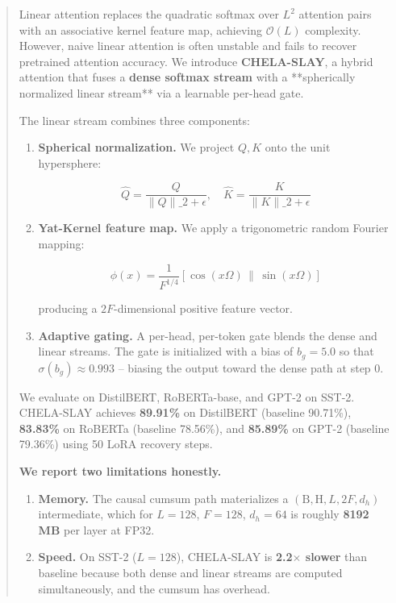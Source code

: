 \documentclass{article}
\begin{document}
\maketitle

\begin{abstract}
Linear attention replaces the quadratic softmax over $L^2$ attention pairs 
with an associative kernel feature map, achieving $\mathcal{O}(L)$ complexity. 
However, naive linear attention is often unstable and fails to recover 
pretrained attention accuracy. We introduce \textbf{CHELA-SLAY}, a hybrid attention 
that fuses a \textbf{dense softmax stream} with a **spherically normalized linear 
stream** via a learnable per-head gate.

The linear stream combines three components:

\begin{enumerate}
\item \textbf{Spherical normalization.} We project $Q, K$ onto the unit hypersphere:
  
  $$
  \hat{Q} = \frac{Q}{\|Q\|\_2 + \epsilon}, \quad
  \hat{K} = \frac{K}{\|K\|\_2 + \epsilon}
  $$
  
\item \textbf{Yat-Kernel feature map.} We apply a trigonometric random Fourier
  mapping:
  
  $$
  \phi(x) = \frac{1}{F^{1/4}} [\cos(x \Omega) \,\|\, \sin(x \Omega)]
  $$
  
  producing a $2F$-dimensional positive feature vector.
\item \textbf{Adaptive gating.} A per-head, per-token gate blends the dense and
  linear streams. The gate is initialized with a bias of
  $b_g = 5.0$ so that $\sigma(b_g) \approx 0.993$
  -- biasing the output toward the dense path at step 0.

\end{enumerate}
We evaluate on DistilBERT, RoBERTa-base, and GPT-2 on SST-2. CHELA-SLAY 
achieves \textbf{89.91\%} on DistilBERT (baseline 90.71\%), 
\textbf{83.83\%} on RoBERTa (baseline 78.56\%), and \textbf{85.89\%} on 
GPT-2 (baseline 79.36\%) using 50 LoRA recovery steps.

\textbf{We report two limitations honestly.}

\begin{enumerate}
\item \textbf{Memory.} The causal cumsum path materializes a
  $(\text{B}, \text{H}, L, 2F, d_h)$ intermediate, which for
  $L = 128$, $F = 128$, $d_h = 64$ is roughly
  \textbf{8192 MB} per layer at FP32.
\item \textbf{Speed.} On SST-2 ($L = 128$), CHELA-SLAY is \textbf{2.2$\times$ slower}
  than baseline because both dense and linear streams are computed
  simultaneously, and the cumsum has overhead.


\end{enumerate}
\end{abstract}
\end{document}
